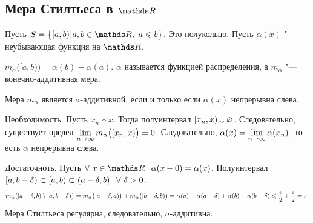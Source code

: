\subsection{Мера Стилтьеса в $\R$}
Пусть $S = \big\{[a,b)\big| a,b\in\R,\ a\le b\big\}$. Это полукольцо. Пусть $\alpha(x)$ "--- неубывающая функция на $\R$.
\begin{Def}
  $m_\alpha\big([a,b)\big) = \alpha(b)-\alpha(a)$. $\alpha$ называется функцией распределения, а $m_\alpha$ "--- конечно-аддитивная мера.
\end{Def}
\begin{The}
  Мера $m_\alpha$ является $\sigma$-аддитивной, если и только если $\alpha(x)$ непрерывна слева.
\end{The}
\begin{Proof}
 Необходимость. Пусть $x_n\uparrow x$. Тогда полуинтервал $[x_n,x)\downarrow\varnothing$. Следовательно, существует предел $\lim\limits_{n\rightarrow\infty} m_\alpha\big([x_n,x)\big) = 0$. Следовательно, $\alpha(x) = \lim\limits_{n\rightarrow\infty} \alpha(x_n)$, то есть $\alpha$ непрерывна слева.

Достаточноть. Пусть $\forall\ x\in \R\pau \alpha(x-0) = \alpha(x)$. Полуинтервал $[a,b-\delta)\subset [a,b)\subset (a-\delta,b)\hskip .75em plus.1em minus.08em\relax \forall\ \delta>0$.
\[
  m_\alpha\big([a-\delta,b)\setminus [a,b-\delta)\big) = m_\alpha\big([a-\delta,a)\big) + m_\alpha\big([b-\delta,b)\big) = 
  \alpha(a) - \alpha(a-\delta) + \alpha(b)- \alpha(b-\delta)\leqslant \frac{\varepsilon}2+\frac{\varepsilon}2 = \varepsilon.
\]
Мера Стилтьеса регулярна, следовательно, $\sigma$-аддитивна.
\end{Proof}

